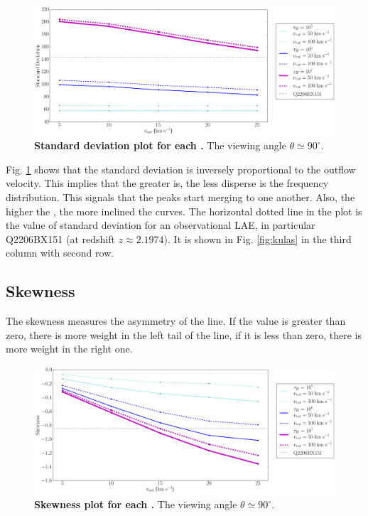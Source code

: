 \begin{figure}[h!]
	\begin{center}
		\includegraphics[width=1\textwidth]{./figures/chapter3/std}
	\end{center}
	\caption{\textbf{Standard deviation plot for each \tauh.} The viewing angle $\theta \simeq 90^\circ$.
	\label{fig:std}}
\end{figure}

Fig. \ref{fig:std} shows that the standard deviation is inversely proportional to the outflow velocity. This implies that the greater \vout is, the less disperse is the \lya frequency distribution. This signals that the peaks start merging to one another. Also, the higher the \tauh, the more inclined the curves. The horizontal dotted line in the plot is the value of standard deviation for an observational LAE, in particular Q2206BX151 (at redshift $z\approx2.1974$). It is shown in Fig. \ref{fig:kulas} in the third column with second row. \\

\subsection{Skewness}
The skewness measures the asymmetry of the \lya line. If the value is greater than zero, there is more weight in the left tail of the line, if it is less than zero, there is more weight in the right one.\\

\begin{figure}[h!]
	\begin{center}
		\includegraphics[width=1\textwidth]{./figures/chapter3/skw}
	\end{center}
	\caption{\textbf{Skewness plot for each \tauh.} The viewing angle $\theta \simeq 90^\circ$. 
		\label{fig:skw}}
\end{figure}

